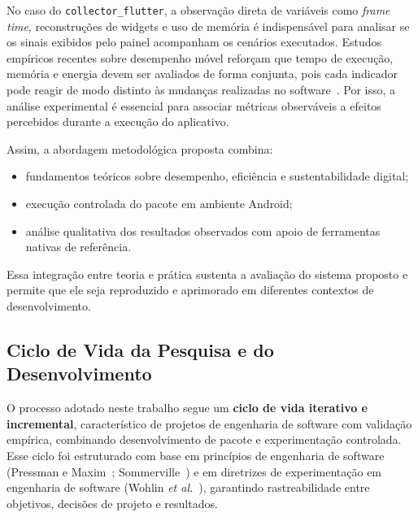No caso do \texttt{collector\_flutter}, a observação direta de variáveis como \textit{frame time}, reconstruções de widgets e uso de memória é indispensável para analisar se os sinais exibidos pelo painel acompanham os cenários executados.
Estudos empíricos recentes sobre desempenho móvel reforçam que tempo de execução, memória e energia devem ser avaliados de forma conjunta, pois cada indicador pode reagir de modo distinto às mudanças realizadas no software~\cite{rua2024largescale}. Por isso, a análise experimental é essencial para associar métricas observáveis a efeitos percebidos durante a execução do aplicativo.

Assim, a abordagem metodológica proposta combina:
\begin{itemize}
  \item fundamentos teóricos sobre desempenho, eficiência e sustentabilidade digital;
  \item execução controlada do pacote em ambiente Android;
  \item análise qualitativa dos resultados observados com apoio de ferramentas nativas de referência.
\end{itemize}

Essa integração entre teoria e prática sustenta a avaliação do sistema proposto e permite que ele seja reproduzido e aprimorado em diferentes contextos de desenvolvimento.



\subsection{Ciclo de Vida da Pesquisa e do Desenvolvimento}

O processo adotado neste trabalho segue um \textbf{ciclo de vida iterativo e incremental}, característico de projetos de engenharia de software com validação empírica, combinando desenvolvimento de pacote e experimentação controlada.
Esse ciclo foi estruturado com base em princípios de engenharia de software (Pressman e Maxim~\cite{pressman2020engenharia}; Sommerville~\cite{sommerville2019software}) e em diretrizes de experimentação em engenharia de software (Wohlin \textit{et al.}~\cite{wohlin2012}), garantindo rastreabilidade entre objetivos, decisões de projeto e resultados.

